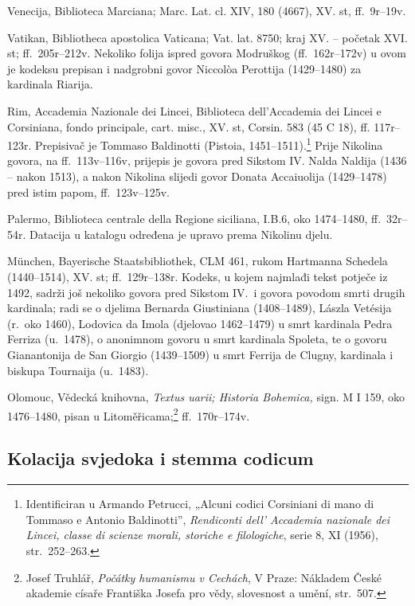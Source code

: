 \documentclass[a5paper,twoside]{article}
\begin{document}
\begin{description}[nolistsep,itemsep=3pt,font=\rmfamily]
\item[ve] Venecija, Biblioteca Marciana; Marc. Lat. cl. XIV, 180 (4667), XV. st, ff.~9r–19v.
\item[va] Vatikan, Bibliotheca apostolica Vaticana; Vat. lat. 8750; kraj XV. – početak XVI. st; ff.~205r–212v. Nekoliko folija ispred govora Modruškog (ff.~162r–172v) u ovom je kodeksu prepisan i nadgrobni govor Niccolòa Perottija (1429–1480) za kardinala Riarija.
\item[co] Rim, Accademia Nazionale dei Lincei, Biblioteca dell'Accademia dei Lincei e Corsiniana, fondo principale, cart. misc., XV. st, Corsin. 583 (45 C 18), ff. 117r–123r. Prepisivač je Tommaso Baldinotti (Pistoia, 1451–1511).\footnote{Identificiran u Armando Petrucci, „Alcuni codici Corsiniani di mano di Tommaso e Antonio Baldinotti”, \textit{Rendiconti dell' Accademia nazionale dei Lincei, classe di scienze morali, storiche e filologiche}, serie 8, XI (1956), str.~252–263.} Prije Nikolina govora, na ff.~113v–116v, prijepis je govora pred Sikstom IV. Nalda Naldija (1436 – nakon 1513), a nakon Nikolina slijedi govor Donata Accaiuolija (1429–1478) pred istim papom, ff.~123v–125v.
\item[pa] Palermo, Biblioteca centrale della Regione siciliana, I.B.6, oko 1474–1480, ff.~32r–54r. Datacija u katalogu određena je upravo prema Nikolinu djelu.
\item[m] München, Bayerische Staatsbibliothek, CLM 461, rukom Hartmanna Schedela (1440–1514), XV. st; ff.~129r–138r. Kodeks, u kojem najmlađi tekst potječe iz 1492, sadrži još nekoliko govora pred Sikstom IV.\ i govora povodom smrti drugih kardinala; radi se o djelima Bernarda Giustiniana (1408–1489), Lászla Vetésija (r.~oko 1460), Lodovica da Imola (djelovao 1462–1479) u smrt kardinala Pedra Ferriza (u.~1478), o anonimnom govoru u smrt kardinala Spoleta, te o govoru Gianantonija de San Giorgio (1439–1509) u smrt Ferrija de Clugny, kardinala i biskupa Tournaija (u.~1483).
\item[o] Olomouc, Vědecká knihovna, \textit{Textus uarii; Historia Bohemica,} sign. M I 159, oko 1476–1480, pisan u Litoměřicama;\footnote{Josef Truhlář, \textit{Počátky humanismu v Cechách}, V Praze: Nákladem České akademie císaře Františka Josefa pro vědy, slovesnost a umění, str.~507.} ff.~170r–174v.
\end{description}

\subsection{Kolacija svjedoka i stemma codicum}
\end{document}
